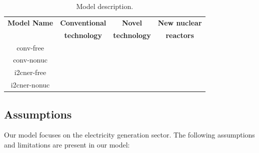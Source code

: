 \documentclass[14pt,a4paper]{article} %
\newcommand{\greencheck}{{\color{green}\checkmark}}
\newcommand{\xmark}{{\color{red}\ding{55}}}
\begin{document}
\begin{table}[H]
\centering
\caption{\label{tab:models} Model description.}
\begin{tabular}{| c | c | c | c |}
\hline
\textbf{Model Name}&\textbf{Conventional}&\textbf{Novel}&\textbf{New nuclear}\\
            &\textbf{technology}&\textbf{technology}&\textbf{reactors}\\
                  \hline
conv-free &      \greencheck           &         \xmark       &      \greencheck     \\ 
conv-nonuc &      \greencheck           &         \xmark       &         \xmark       \\ 
i2cner-free &      \greencheck           &      \greencheck     &      \greencheck     \\ 
i2cner-nonuc &      \greencheck           &      \greencheck     &         \xmark       \\
\hline
\end{tabular}
\end{table}

\subsection{Assumptions}

Our model focuses on the electricity generation sector. The following assumptions and limitations are present in our model:
	
\end{document}
